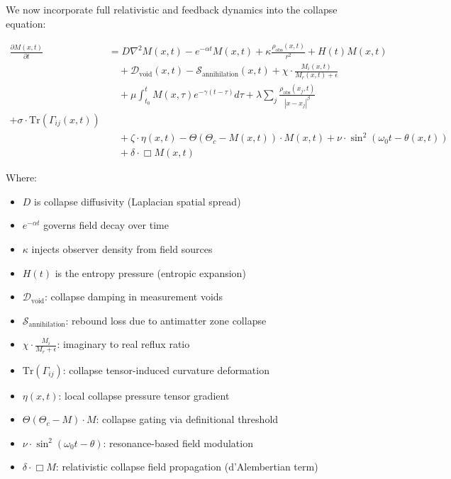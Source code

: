 We now incorporate full relativistic and feedback dynamics into the collapse equation:


\begin{equation}
  \begin{aligned}
  \frac{\partial M(x,t)}{\partial t} &= D \nabla^2 M(x,t)
  - e^{-\alpha t} M(x,t)
  + \kappa \frac{\rho_{\text{obs}}(x,t)}{r^2}
  + H(t) M(x,t) \\
  &\quad + \mathcal{D}_{\text{void}}(x,t)
  - \mathcal{S}_{\text{annihilation}}(x,t)
  + \chi \cdot \frac{M_i(x,t)}{M_r(x,t) + \epsilon} \\
  &\quad + \mu \int_{t_0}^{t} M(x,\tau) e^{-\gamma(t - \tau)} d\tau
  + \lambda \sum_j \frac{\rho_{\text{obs}}(x_j,t)}{|x - x_j|^\beta} \\
  + \sigma \cdot \text{Tr}(\Gamma_{ij}(x,t)) \\
  &\quad + \zeta \cdot \eta(x,t)
  - \Theta(\Theta_c - M(x,t)) \cdot M(x,t)
  + \nu \cdot \sin^2\left( \omega_0 t - \theta(x,t) \right) \\
  &\quad + \delta \cdot \Box M(x,t)
  \end{aligned}
  \end{equation}
  
  
Where:
\begin{itemize}
  \item \( D \) is collapse diffusivity (Laplacian spatial spread)
  \item \( e^{-\alpha t} \) governs field decay over time
  \item \( \kappa \) injects observer density from field sources
  \item \( H(t) \) is the entropy pressure (entropic expansion)
  \item \( \mathcal{D}_{\text{void}} \): collapse damping in measurement voids
  \item \( \mathcal{S}_{\text{annihilation}} \): rebound loss due to antimatter zone collapse
  \item \( \chi \cdot \frac{M_i}{M_r + \epsilon} \): imaginary to real reflux ratio
  \item \( \text{Tr}(\Gamma_{ij}) \): collapse tensor-induced curvature deformation
  \item \( \eta(x,t) \): local collapse pressure tensor gradient
  \item \( \Theta(\Theta_c - M) \cdot M \): collapse gating via definitional threshold
  \item \( \nu \cdot \sin^2(\omega_0 t - \theta) \): resonance-based field modulation
  \item \( \delta \cdot \Box M \): relativistic collapse field propagation (d’Alembertian term)
\end{itemize}

